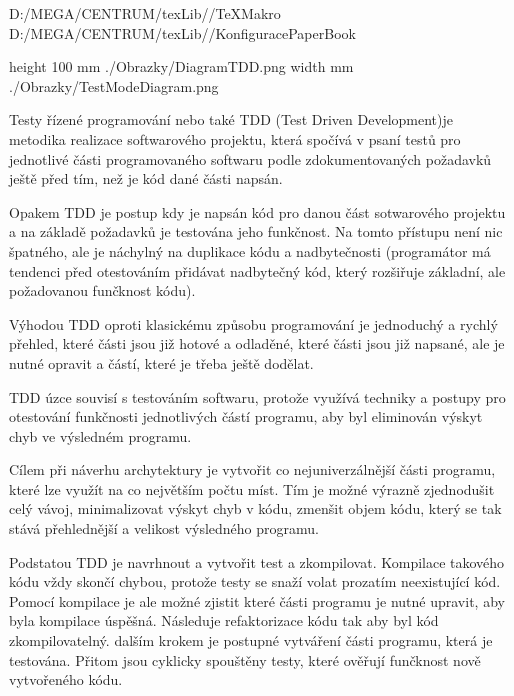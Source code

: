 \def\addr{D:/MEGA/CENTRUM/texLib/}


 \addr/TeXMakro
\setAddress{\addr}
 \addr/KonfiguracePaperBook

\pdfximage height 100 mm {./Obrazky/DiagramTDD.png}
\pdfximage width \the\SirkaOdstavce mm {./Obrazky/TestModeDiagram.png}



\Obsah



Testy řízené programování nebo také TDD (Test Driven Development)je metodika realizace softwarového projektu, která spočívá v psaní testů pro jednotlivé části programovaného softwaru podle zdokumentovaných požadavků ještě před tím, než je kód dané části napsán. 

Opakem TDD je postup kdy je napsán kód pro danou část sotwarového projektu a na základě požadavků je testována jeho funkčnost. Na tomto přístupu není nic špatného, ale je náchylný na duplikace kódu a nadbytečnosti (programátor má tendenci před otestováním přidávat nadbytečný kód, který rozšiřuje základní, ale požadovanou funčknost kódu).

Výhodou TDD oproti klasickému způsobu programování je jednoduchý a rychlý přehled, které části jsou již hotové a odladěné, které části jsou již napsané, ale je nutné opravit a částí, které je třeba ještě dodělat.

TDD úzce souvisí s testováním softwaru, protože využívá techniky a postupy pro otestování funkčnosti jednotlivých částí programu, aby byl eliminován výskyt chyb ve výsledném programu.





Cílem při náverhu archytektury je vytvořit co nejuniverzálnější části programu, které lze využít na co největším počtu míst. Tím je možné výrazně zjednodušit celý vávoj, minimalizovat výskyt chyb v kódu, zmenšit objem kódu, který se tak stává přehlednější a velikost výsledného programu.




Podstatou TDD je navrhnout a vytvořit test a zkompilovat. Kompilace takového kódu vždy skončí chybou, protože testy se snaží volat prozatím neexistující kód. Pomocí kompilace je ale možné zjistit které části programu je nutné upravit, aby byla kompilace úspěšná. Následuje refaktorizace kódu tak aby byl kód zkompilovatelný. dalším krokem je postupné vytváření části programu, která je testována. Přitom jsou cyklicky spouštěny testy, které ověřují funčknost nově vytvořeného kódu. 

